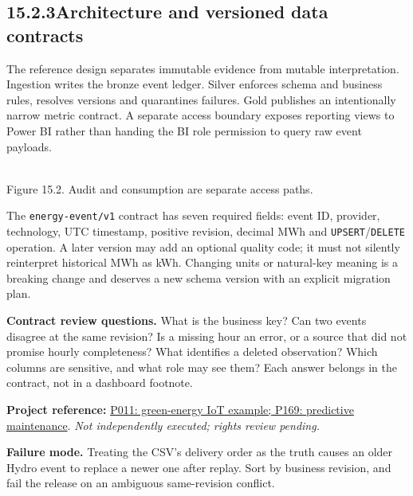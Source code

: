 \documentclass[11pt,twoside]{article}
\newcommand{\topic}[2]{\subsection*{#1\quad #2}}
\newcommand{\repo}[2]{\par\begingroup\fontsize{8.0}{9.6}\selectfont\sffamily\color{inkgray}\textbf{Project reference:} \href{#2}{#1}. \textit{Not independently executed; rights review pending.}\par\endgroup}
\begin{document}
\newpage

\topic{15.2.3}{Architecture and versioned data contracts}
The reference design separates immutable evidence from mutable interpretation. Ingestion writes the bronze event ledger. Silver enforces schema and business rules, resolves versions and quarantines failures. Gold publishes an intentionally narrow metric contract. A separate access boundary exposes reporting views to Power BI rather than handing the BI role permission to query raw event payloads.
\begin{center}\\{\fontsize{8}{9}\selectfont\color{inkgray}Figure 15.2. Audit and consumption are separate access paths.}\end{center}
The \texttt{energy-event/v1} contract has seven required fields: event ID, provider, technology, UTC timestamp, positive revision, decimal MWh and \texttt{UPSERT}/\texttt{DELETE} operation. A later version may add an optional quality code; it must not silently reinterpret historical MWh as kWh. Changing units or natural-key meaning is a breaking change and deserves a new schema version with an explicit migration plan.
\begin{whitebox}\textbf{Contract review questions.} What is the business key? Can two events disagree at the same revision? Is a missing hour an error, or a source that did not promise hourly completeness? What identifies a deleted observation? Which columns are sensitive, and what role may see them? Each answer belongs in the contract, not in a dashboard footnote.\end{whitebox}
\repo{P011: green-energy IoT example; P169: predictive maintenance}{https://github.com/nbaubek/green-energy-iot-de-project}
\textbf{Failure mode.} Treating the CSV's delivery order as the truth causes an older Hydro event to replace a newer one after replay. Sort by business revision, and fail the release on an ambiguous same-revision conflict.
\end{document}
